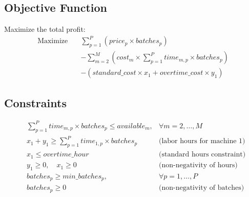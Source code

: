 \documentclass{article}
\begin{document}
\subsection*{Objective Function}
Maximize the total profit:
\begin{align*}
    \text{Maximize} \quad & \sum_{p=1}^{P} \left( price_{p} \times batches_{p} \right) \\
    & - \sum_{m=2}^{M} \left( cost_{m} \times \sum_{p=1}^{P} time_{m,p} \times batches_{p} \right) \\
    & - \left( standard\_cost \times x_{1} + overtime\_cost \times y_{1} \right)
\end{align*}

\subsection*{Constraints}
\begin{align*}
    & \sum_{p=1}^{P} time_{m,p} \times batches_{p} \leq available_{m}, & \forall m = 2, \ldots, M \\
    & x_{1} + y_{1} \geq \sum_{p=1}^{P} time_{1,p} \times batches_{p} & \text{(labor hours for machine 1)} \\
    & x_{1} \leq overtime\_hour & \text{(standard hours constraint)} \\
    & y_{1} \geq 0, \quad x_{1} \geq 0 & \text{(non-negativity of hours)} \\
    & batches_{p} \geq min\_batches_{p}, & \forall p = 1, \ldots, P \\
    & batches_{p} \geq 0 & \text{(non-negativity of batches)}
\end{align*}
\end{document}
